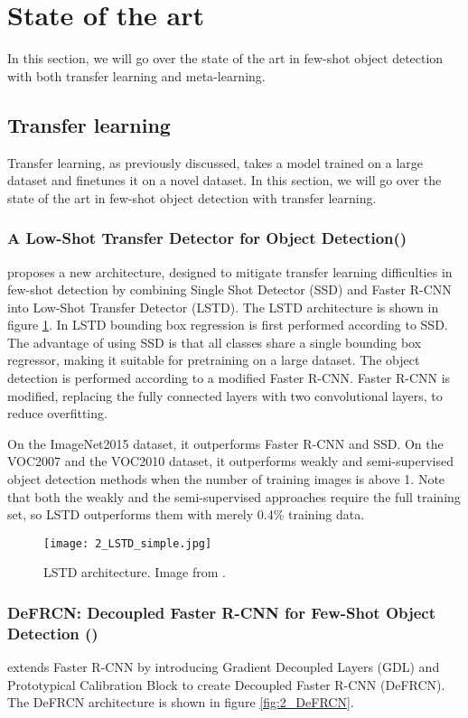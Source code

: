 \section{State of the art}
In this section, we will go over the state of the art in few-shot object detection with both transfer learning and meta-learning.
\subsection{Transfer learning}
Transfer learning, as previously discussed, takes a model trained on a large dataset and finetunes it on a novel dataset. In this section, we will go over the state of the art in few-shot object detection with transfer learning.

\subsubsection{A Low-Shot Transfer Detector for Object Detection(\citet{LSTD})}
\citet{LSTD} proposes a new architecture, designed to mitigate transfer learning difficulties in few-shot detection by combining Single Shot Detector (SSD) and Faster R-CNN into Low-Shot Transfer Detector (LSTD). The LSTD architecture is shown in figure \ref{fig:2_LSTD}. In LSTD bounding box regression is first performed according to SSD. The advantage of using SSD is that all classes share a single bounding box regressor, making it suitable for pretraining on a large dataset. The object detection is performed according to a modified Faster R-CNN. Faster R-CNN is modified, replacing the fully connected layers with two convolutional layers, to reduce overfitting.

On the ImageNet2015 dataset, it outperforms Faster R-CNN and SSD. On the VOC2007 and the VOC2010 dataset, it outperforms weakly and semi-supervised object detection methods when the number of training images is above 1. Note that both the weakly and the semi-supervised approaches require the full training set, so LSTD outperforms them with merely 0.4\% training data.

\begin{figure}[h]
	\centering
	\texttt{[image: 2\_LSTD\_simple.jpg]}
	\caption{\label{fig:2_LSTD} LSTD architecture. Image from \citet{LSTD}.}
\end{figure}

\subsubsection{DeFRCN: Decoupled Faster R-CNN for Few-Shot Object Detection (\citet{DeFRCN})}
\citet{DeFRCN} extends Faster R-CNN\cite{fasterrcnn} by introducing Gradient Decoupled Layers (GDL) and Prototypical Calibration Block to create Decoupled Faster R-CNN (DeFRCN). The DeFRCN architecture is shown in figure \ref{fig:2_DeFRCN}.


